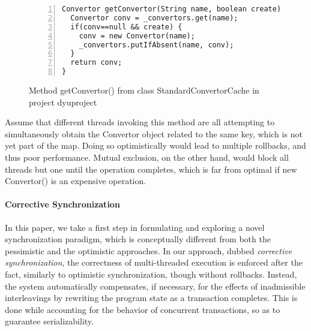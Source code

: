 
\begin{figure}
	\begin{lstlisting}[numbers=left]
Convertor getConvertor(String name, boolean create) {
  Convertor conv = _convertors.get(name);
  if(conv==null && create) {
    conv = new Convertor(name);
    _convertors.putIfAbsent(name, conv);
  }
  return conv;
}
	\end{lstlisting}
	\caption{\label{Fi:introMotivating}Method {\sf getConvertor()} from class {\sf StandardConvertorCache} in project {\sf dyuproject}}
\end{figure}

Assume that different threads invoking this method are all attempting to simultaneously obtain the {\sf Convertor} object related to the same key, which is not yet part of the map. Doing so optimistically would lead to multiple rollbacks, and thus poor performance. Mutual exclusion, on the other hand, would block all threads but one until the operation completes, which is far from optimal if {\sf new Convertor()} is an expensive operation.

\paragraph{Corrective Synchronization} In this paper, we take a first step in formulating and exploring a novel synchronization paradigm, which is conceptually different from both the pessimistic and the optimistic approaches. In our approach, dubbed \emph{corrective synchronization}, the correctness of multi-threaded execution is enforced after the fact, similarly to optimistic synchronization, though without rollbacks. Instead, the system automatically compensates, if necessary, for the effects of inadmissible interleavings by rewriting the program state as a transaction completes. This is done while accounting for the behavior of concurrent transactions, so as to guarantee serializability.

